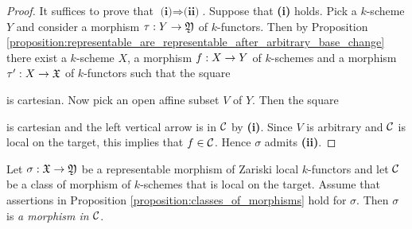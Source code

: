 \begin{proof}
It suffices to prove that $\textbf{(i)}\Rightarrow \textbf{(ii)}$. Suppose that \textbf{(i)} holds. Pick a $k$-scheme $Y$ and consider a morphism $\tau:Y\rightarrow {\mathfrak Y}$ of $k$-functors. Then by Proposition \ref{proposition:representable_are_representable_after_arbitrary_base_change} there exist a $k$-scheme $X$, a morphism $f:X\rightarrow Y$ of $k$-schemes and a morphism $\tau':X\rightarrow {\mathfrak X}$ of $k$-functors such that the square
\begin{center}
\end{center}
is cartesian. Now pick an open affine subset $V$ of $Y$. Then the square 
\begin{center}
\end{center}
is cartesian and the left vertical arrow is in ${\mathcal C}$ by \textbf{(i)}. Since $V$ is arbitrary and ${\mathcal C}$ is local on the target, this implies that $f\in {\mathcal C}$. Hence $\sigma$ admits \textbf{(ii)}.
\end{proof}

\begin{definition}\label{definition:classes_of_morphism_of_Zariski_local_k_functors}
Let $\sigma:{\mathfrak X}\rightarrow {\mathfrak Y}$ be a representable morphism of Zariski local $k$-functors and let ${\mathcal C}$ be a class of morphism of $k$-schemes that is local on the target. Assume that assertions in Proposition \ref{proposition:classes_of_morphisms} hold for $\sigma$. Then $\sigma$ is \textit{a morphism in ${\mathcal C}$}.
\end{definition}

